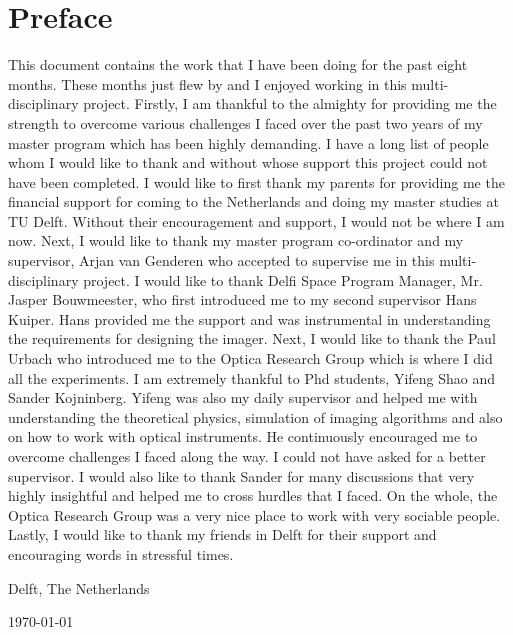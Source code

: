 \chapter*{Preface}
This document contains the work that I have been doing for the past eight months. These months just flew by and I enjoyed working in this multi-disciplinary project. Firstly, I am thankful to the almighty for providing me the strength to overcome various challenges I faced over the past two years of my master program which has been highly demanding. I have a long list of people whom I would like to thank and without whose support this project could not have been completed.
I would like to first thank my parents for providing me the financial support for coming to the Netherlands and doing my master studies at TU Delft. Without their encouragement and support, I would not be where I am now. Next, I would like to thank my master program co-ordinator and my supervisor, Arjan van Genderen who accepted to supervise me in this multi-disciplinary project. I would like to thank Delfi Space Program Manager, Mr. Jasper Bouwmeester, who first introduced me to my second supervisor Hans Kuiper. Hans provided me the support and was instrumental in understanding the requirements for designing the imager. Next, I would like to thank the Paul Urbach who introduced me to the Optica Research Group which is where I did all the experiments. I am extremely thankful to Phd students, Yifeng Shao and Sander Kojninberg. Yifeng was also my daily supervisor and helped me with understanding the theoretical physics, simulation of imaging algorithms and also on how to work with optical instruments. He continuously encouraged me to overcome challenges I faced along the way. I could not have asked for a better supervisor. I would also like to thank Sander for many discussions that very highly insightful and helped me to cross hurdles that I faced. On the whole, the Optica Research Group was a very nice place to work with very sociable people. Lastly, I would like to thank my friends in Delft for their support and encouraging words in stressful times. 



\noindent
Delft, The Netherlands

\noindent
\today
